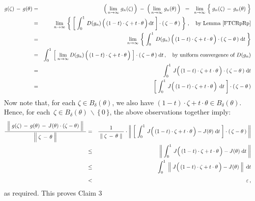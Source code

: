 \begin{eqnarray*}
g(\zeta) \, - \, g(\theta)
& = &
	\left(\,\underset{n\rightarrow\infty}{\lim}\; g_{n}(\zeta)\,\right)
	\; - \;
	\left(\,\underset{n\rightarrow\infty}{\lim}\; g_{n}(\theta)\,\right)
\;\; = \;\;
	\underset{n\rightarrow\infty}{\lim}\,
	\left\{\; g_{n}(\zeta) \, \overset{{\color{white}.}}{-} \, g_{n}(\theta) \;\right\}
\\
& = &
	\underset{n\rightarrow\infty}{\lim}\,
	\left\{\;
		\left[\;
			\int_{0}^{1}\, D(g_{n})\left(\,(1-t)\cdot\zeta \overset{{\color{white}.}}{+} t \cdot \theta \,\right) \d t
			\;\right]
		\cdot
		(\,\zeta - \theta\,)
		\;\right\}\,,
	\quad
	\textnormal{by Lemma \ref{FTCRpRp}}
\\
& = &
	\underset{n\rightarrow\infty}{\lim}\,
	\left\{\;
		\int_{0}^{1}\, D(g_{n})\left(\,(1-t)\cdot\zeta \overset{{\color{white}.}}{+} t \cdot \theta \,\right) \cdot (\,\zeta - \theta\,) \; \d t
		\;\right\}
\\
& = &
	\int_{0}^{1}\, 
		\left[\;
			\underset{n\rightarrow\infty}{\lim}\, D(g_{n})\left(\,(1-t)\cdot\zeta \overset{{\color{white}.}}{+} t \cdot \theta \,\right)
			\;\right]
		\cdot (\,\zeta - \theta\,)
		\; \d t\,,
	\quad
	\textnormal{by uniform convergence of $D(g_{n})$}
\\
& = &
	\int_{0}^{1}\, 
		J\!\left(\,(1-t)\cdot\zeta \overset{{\color{white}.}}{+} t \cdot \theta \,\right)
		\cdot (\,\zeta - \theta\,)
		\; \d t
\\
& = &
	\left[\;
		\int_{0}^{1}\, 
			J\!\left(\,(1-t)\cdot\zeta \overset{{\color{white}.}}{+} t \cdot \theta \,\right)
			\; \d t
		\;\right]
		\cdot (\,\zeta - \theta\,)
\end{eqnarray*}
Now note that, for each $\zeta \in B_{\delta}(\theta)$, we also have
$(1-t)\cdot\zeta + t \cdot \theta \in B_{\delta}(\theta)$.
Hence, for each \,$\zeta \in B_{\delta}(\theta)\,\backslash\,\{\,0\,\}$,
the above observations together imply:
\begin{eqnarray*}
\dfrac{
	{\color{white}.}
	\left\Vert\;
		g(\zeta) \, \overset{{\color{white}.}}{-} \, g(\theta) \, - \, J(\theta)\cdot(\zeta - \theta)
		\;\right\Vert
	{\color{white}.}
	}{
	\left\Vert\;
		\zeta \, \overset{{\color{white}.}}{-} \, \theta
		\;\right\Vert
	}
& = &
	\dfrac{1}{
		{\color{white}.}
		\Vert\;
			\zeta \, \overset{{\color{white}.}}{-} \, \theta
			\;\Vert
		{\color{white}.}
		}
	\cdot
	\left\Vert\;
		\left[\;
			\int_{0}^{1}\, 
				J\!\left(\,(1-t)\cdot\zeta \overset{{\color{white}.}}{+} t \cdot \theta \,\right) - J(\theta)
				\; \d t
		\;\right]
		\cdot (\,\zeta - \theta\,)
		\;\right\Vert
\\
& \leq &
	\left\Vert\;
		\int_{0}^{1}\, 
			J\!\left(\,(1-t)\cdot\zeta \overset{{\color{white}.}}{+} t \cdot \theta \,\right) - J(\theta)
			\; \d t
		\;\right\Vert
\\
& \leq &
	\int_{0}^{1}\;
		\left\Vert\;
			J\!\left(\,(1-t)\cdot\zeta \overset{{\color{white}.}}{+} t \cdot \theta \,\right) - J(\theta)
			\;\right\Vert
		\; \d t
\\
& < &
	\overset{{\color{white}1}}{\varepsilon}\,,
\end{eqnarray*}
as required. This proves Claim 3

